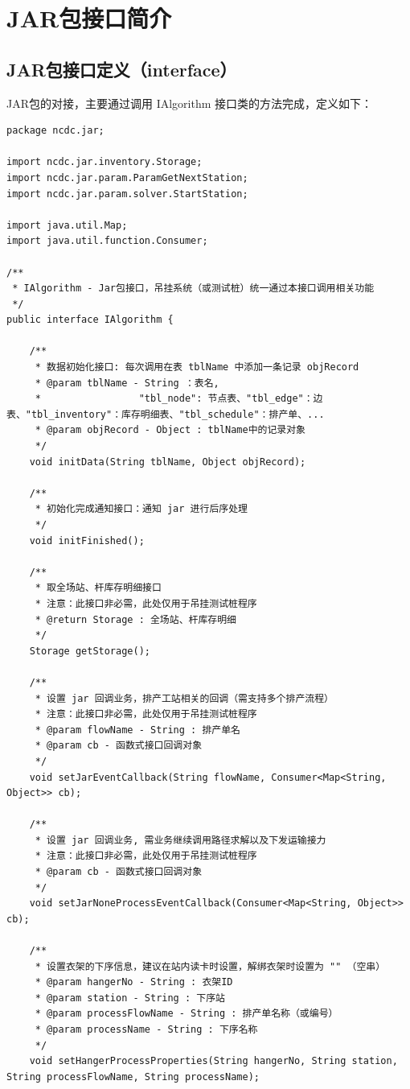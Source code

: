 \section{JAR包接口简介}
\subsection{JAR包接口定义（interface）}
JAR包的对接，主要通过调用 IAlgorithm 接口类的方法完成，定义如下：
\begin{lstlisting}
package ncdc.jar;

import ncdc.jar.inventory.Storage;
import ncdc.jar.param.ParamGetNextStation;
import ncdc.jar.param.solver.StartStation;

import java.util.Map;
import java.util.function.Consumer;

/**
 * IAlgorithm - Jar包接口，吊挂系统（或测试桩）统一通过本接口调用相关功能
 */
public interface IAlgorithm {

    /**
     * 数据初始化接口: 每次调用在表 tblName 中添加一条记录 objRecord
     * @param tblName - String ：表名,
     *                 "tbl_node": 节点表、"tbl_edge"：边表、"tbl_inventory"：库存明细表、"tbl_schedule"：排产单、...
     * @param objRecord - Object : tblName中的记录对象
     */
    void initData(String tblName, Object objRecord);

    /**
     * 初始化完成通知接口：通知 jar 进行后序处理
     */
    void initFinished();

    /**
     * 取全场站、杆库存明细接口
     * 注意：此接口非必需，此处仅用于吊挂测试桩程序
     * @return Storage : 全场站、杆库存明细
     */
    Storage getStorage();

    /**
     * 设置 jar 回调业务，排产工站相关的回调（需支持多个排产流程）
     * 注意：此接口非必需，此处仅用于吊挂测试桩程序
     * @param flowName - String : 排产单名
     * @param cb - 函数式接口回调对象
     */
    void setJarEventCallback(String flowName, Consumer<Map<String, Object>> cb);

    /**
     * 设置 jar 回调业务, 需业务继续调用路径求解以及下发运输接力
     * 注意：此接口非必需，此处仅用于吊挂测试桩程序
     * @param cb - 函数式接口回调对象
     */
    void setJarNoneProcessEventCallback(Consumer<Map<String, Object>> cb);

    /**
     * 设置衣架的下序信息，建议在站内读卡时设置，解绑衣架时设置为 "" （空串）
     * @param hangerNo - String : 衣架ID
     * @param station - String : 下序站
     * @param processFlowName - String : 排产单名称（或编号）
     * @param processName - String : 下序名称
     */
    void setHangerProcessProperties(String hangerNo, String station, String processFlowName, String processName);


\end{lstlisting}
